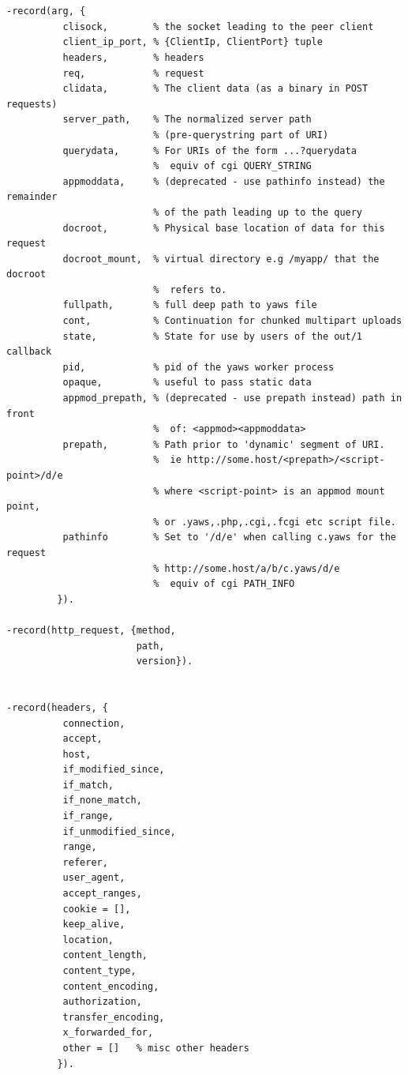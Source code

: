 \documentclass[11pt,oneside,english]{book}
\begin{document}
\begin{verbatim}


-record(arg, {
          clisock,        % the socket leading to the peer client
          client_ip_port, % {ClientIp, ClientPort} tuple
          headers,        % headers
          req,            % request
          clidata,        % The client data (as a binary in POST requests)
          server_path,    % The normalized server path
                          % (pre-querystring part of URI)
          querydata,      % For URIs of the form ...?querydata
                          %  equiv of cgi QUERY_STRING
          appmoddata,     % (deprecated - use pathinfo instead) the remainder
                          % of the path leading up to the query
          docroot,        % Physical base location of data for this request
          docroot_mount,  % virtual directory e.g /myapp/ that the docroot
                          %  refers to.
          fullpath,       % full deep path to yaws file
          cont,           % Continuation for chunked multipart uploads
          state,          % State for use by users of the out/1 callback
          pid,            % pid of the yaws worker process
          opaque,         % useful to pass static data
          appmod_prepath, % (deprecated - use prepath instead) path in front
                          %  of: <appmod><appmoddata>
          prepath,        % Path prior to 'dynamic' segment of URI.
                          %  ie http://some.host/<prepath>/<script-point>/d/e
                          % where <script-point> is an appmod mount point,
                          % or .yaws,.php,.cgi,.fcgi etc script file.
          pathinfo        % Set to '/d/e' when calling c.yaws for the request
                          % http://some.host/a/b/c.yaws/d/e
                          %  equiv of cgi PATH_INFO
         }).

-record(http_request, {method,
                       path,
                       version}).


-record(headers, {
          connection,
          accept,
          host,
          if_modified_since,
          if_match,
          if_none_match,
          if_range,
          if_unmodified_since,
          range,
          referer,
          user_agent,
          accept_ranges,
          cookie = [],
          keep_alive,
          location,
          content_length,
          content_type,
          content_encoding,
          authorization,
          transfer_encoding,
          x_forwarded_for,
          other = []   % misc other headers
         }).

\end{verbatim}
\end{document}
